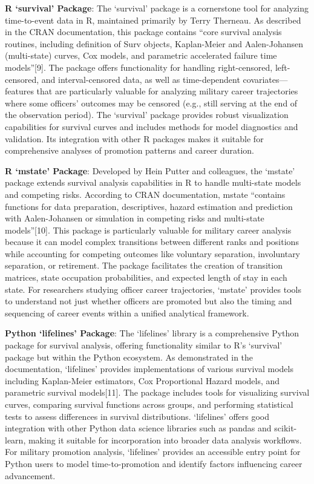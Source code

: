 \documentclass[./main.tex]{subfiles}
\begin{document}
\textbf{R `survival' Package}: The `survival' package is a cornerstone
tool for analyzing time-to-event data in R, maintained primarily by
Terry Therneau. As described in the CRAN documentation, this package
contains ``core survival analysis routines, including definition of Surv
objects, Kaplan-Meier and Aalen-Johansen (multi-state) curves, Cox
models, and parametric accelerated failure time models''{[}9{]}. The
package offers functionality for handling right-censored, left-censored,
and interval-censored data, as well as time-dependent
covariates---features that are particularly valuable for analyzing
military career trajectories where some officers' outcomes may be
censored (e.g., still serving at the end of the observation period). The
`survival' package provides robust visualization capabilities for
survival curves and includes methods for model diagnostics and
validation. Its integration with other R packages makes it suitable for
comprehensive analyses of promotion patterns and career duration.

\textbf{R `mstate' Package}: Developed by Hein Putter and colleagues,
the `mstate' package extends survival analysis capabilities in R to
handle multi-state models and competing risks. According to CRAN
documentation, mstate ``contains functions for data preparation,
descriptives, hazard estimation and prediction with Aalen-Johansen or
simulation in competing risks and multi-state models''{[}10{]}. This
package is particularly valuable for military career analysis because it
can model complex transitions between different ranks and positions
while accounting for competing outcomes like voluntary separation,
involuntary separation, or retirement. The package facilitates the
creation of transition matrices, state occupation probabilities, and
expected length of stay in each state. For researchers studying officer
career trajectories, `mstate' provides tools to understand not just
whether officers are promoted but also the timing and sequencing of
career events within a unified analytical framework.

\textbf{Python `lifelines' Package}: The `lifelines' library is a
comprehensive Python package for survival analysis, offering
functionality similar to R's `survival' package but within the Python
ecosystem. As demonstrated in the documentation, `lifelines' provides
implementations of various survival models including Kaplan-Meier
estimators, Cox Proportional Hazard models, and parametric survival
models{[}11{]}. The package includes tools for visualizing survival
curves, comparing survival functions across groups, and performing
statistical tests to assess differences in survival distributions.
`lifelines' offers good integration with other Python data science
libraries such as pandas and scikit-learn, making it suitable for
incorporation into broader data analysis workflows. For military
promotion analysis, `lifelines' provides an accessible entry point for
Python users to model time-to-promotion and identify factors influencing
career advancement.
\end{document}
